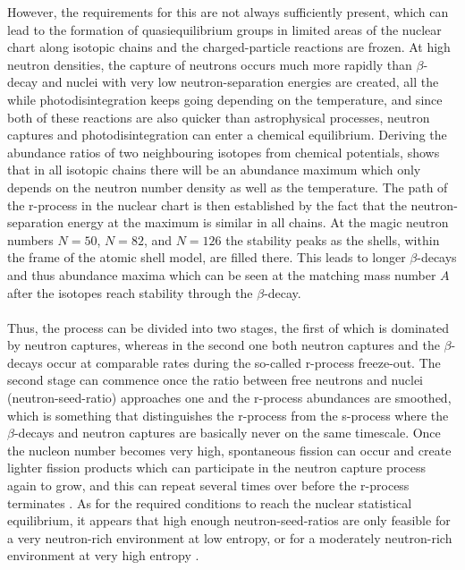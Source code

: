 \documentclass[a4paper,11pt]{article}
\begin{document}
%
However, the requirements for this are not always sufficiently present, which can lead to the formation of quasiequilibrium groups in limited areas of the nuclear chart along isotopic chains and the charged-particle reactions are frozen. At high neutron densities, the capture of neutrons occurs much more rapidly than $\beta$-decay and nuclei with very low neutron-separation energies are created, all the while photodisintegration keeps going depending on the temperature, and since both of these reactions are also quicker than astrophysical processes, neutron captures and photodisintegration can enter a chemical equilibrium. Deriving the abundance ratios of two neighbouring isotopes from chemical potentials, \citet{clayton68} shows that in all isotopic chains there will be an abundance maximum which only depends on the neutron number density as well as the temperature. The path of the r-process in the nuclear chart is then established by the fact that the neutron-separation energy at the maximum is similar in all chains. At the magic neutron numbers $N=50$, $N=82$, and $N=126$ the stability peaks as the shells, within the frame of the atomic shell model, are filled there. This leads to longer $\beta$-decays and thus abundance maxima which can be seen at the matching mass number $A$ after the isotopes reach stability through the $\beta$-decay.\\ \\
%
Thus, the process can be divided into two stages, the first of which is dominated by neutron captures, whereas in the second one both neutron captures and the $\beta$-decays occur at comparable rates during the so-called r-process freeze-out. The second stage can commence once the ratio between free neutrons and nuclei (neutron-seed-ratio) approaches one and the r-process abundances are smoothed, which is something that distinguishes the r-process from the s-process where the $\beta$-decays and neutron captures are basically never on the same timescale. Once the nucleon number becomes very high, spontaneous fission can occur and create lighter fission products which can participate in the neutron capture process again to grow, and this can repeat several times over before the r-process terminates \citep{cowan21}. As for the required conditions to reach the nuclear statistical equilibrium, it appears that high enough neutron-seed-ratios are only feasible for a very neutron-rich environment at low entropy, or for a moderately neutron-rich environment at very high entropy \citep{farouqi10}.\\ \\
\end{document}
